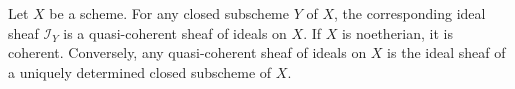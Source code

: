 Let $X$ be a scheme. For any closed subscheme $Y$ of $X$, the corresponding ideal sheaf $\mathcal{I}_Y$ is a quasi-coherent sheaf of ideals on $X$. If $X$ is noetherian, it is coherent. Conversely, any quasi-coherent sheaf of ideals on $X$ is the ideal sheaf of a uniquely determined closed subscheme of $X$.
